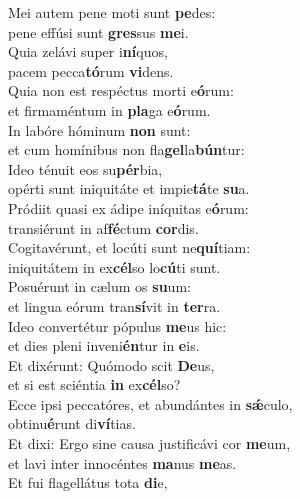 \evenverse Mei autem pene moti sunt \textbf{pe}des:~\*\\
\evenverse pene effúsi sunt \textbf{gres}sus \textbf{me}i.\\
\oddverse Quia zelávi super i\textbf{ní}quos,~\*\\
\oddverse pacem pecca\textbf{tó}rum \textbf{vi}dens.\\
\evenverse Quia non est respéctus morti e\textbf{ó}rum:~\*\\
\evenverse et firmaméntum in \textbf{pla}ga e\textbf{ó}rum.\\
\oddverse In labóre hóminum \textbf{non} sunt:~\*\\
\oddverse et cum homínibus non fla\textbf{gel}la\textbf{bún}tur:\\
\evenverse Ideo ténuit eos su\textbf{pér}bia,~\*\\
\evenverse opérti sunt iniquitáte et impie\textbf{tá}te \textbf{su}a.\\
\oddverse Pródiit quasi ex ádipe iníquitas e\textbf{ó}rum:~\*\\
\oddverse transiérunt in af\textbf{fé}ctum \textbf{cor}dis.\\
\evenverse Cogitavérunt, et locúti sunt ne\textbf{quí}tiam:~\*\\
\evenverse iniquitátem in ex\textbf{cél}so lo\textbf{cú}ti sunt.\\
\oddverse Posuérunt in cælum os \textbf{su}um:~\*\\
\oddverse et lingua eórum tran\textbf{sí}vit in \textbf{ter}ra.\\
\evenverse Ideo convertétur pópulus \textbf{me}us hic:~\*\\
\evenverse et dies pleni inveni\textbf{én}tur in \textbf{e}is.\\
\oddverse Et dixérunt: Quómodo scit \textbf{De}us,~\*\\
\oddverse et si est sciéntia \textbf{in} ex\textbf{cél}so?\\
\evenverse Ecce ipsi peccatóres, et abundántes in \textbf{sǽ}culo,~\*\\
\evenverse obtinu\textbf{é}runt di\textbf{ví}tias.\\
\oddverse Et dixi: Ergo sine causa justificávi cor \textbf{me}um,~\*\\
\oddverse et lavi inter innocéntes \textbf{ma}nus \textbf{me}as.\\
\evenverse Et fui flagellátus tota \textbf{di}e,~\*\\
